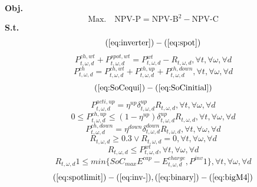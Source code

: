 \documentclass[final,5p,times,twocolumn,authoryear]{elsarticle}
\begin{document}
\noindent
\textbf{Obj.}
\begin{equation} \label{eq:outerobj2}
\text{Max.} \quad \text{NPV-P} = \text{NPV-B}^2 - \text{NPV-C}
\end{equation}
\noindent
\textbf{S.t.}
$$(\ref{eq:inverter}) - (\ref{eq:spot})$$
\begin{equation} \label{eq:windfarmequilibrium}
P_{t,\omega,d}^{ch,wt} + P_{t,\omega,d}^{spot,wt} = P_{t,\omega,d}^{wt}-R_{t,\omega,d} ,\forall t,\forall \omega,\forall d
\end{equation}
\begin{equation} \label{eq:charge2}
P_{t,\omega,d}^{ch} = P_{t,\omega,d}^{ch,wt
}+  P_{t,\omega,d}^{ch,up} + P_{t,\omega,d}^{ch,down},\forall t,\forall \omega,\forall d
\end{equation}
$$(\ref{eq:SoCequi}) - (\ref{eq:SoCinitial})$$
\begin{equation} \label{eq:upregulation}
P_{t,\omega,d}^{acti,up}= \eta^{up}
\delta_{t,\omega,d}^{up}  R_{t,\omega,d} ,\forall t,\forall \omega,\forall d
\end{equation}
\begin{equation} \label{eq:upactivation}
0 \leq P_{t,\omega,d}^{ch,up} \leq (1-\eta^{up}) \delta_{t,\omega,d}^{up} R_{t,\omega,d} ,\forall t,\forall \omega,\forall d
\end{equation}
\begin{equation} \label{eq:downregulation}
P_{t,\omega,d}^{ch,down} = \eta^{down} \delta_{t,\omega,d}^{down}   R_{t,\omega,d},\forall t,\forall \omega,\forall d 
\end{equation}
\begin{equation} \label{minbid}
  R_{t,\omega,d}\geq 0.3 \vee  R_{t,\omega,d} = 0,\forall t,\forall \omega,\forall d 
\end{equation}
\begin{equation} \label{eq:uplimit}
R_{t,\omega,d} \leq P_{t,\omega,d}^{wt}, \forall t,\forall \omega,\forall d 
\end{equation}
\begin{equation} \label{eq:downlimit}
R_{t,\omega,d}1 \leq  min\{ SoC_{max}E^{cap}-E^{charge}_{t,\omega,d},P^{inv}1 \},\forall t,\forall \omega,\forall d 
\end{equation}
$$(\ref{eq:spotlimit}) - (\ref{eq:inv-}),(\ref{eq:binary}) - (\ref{eq:bigM4}) $$
\end{document}
